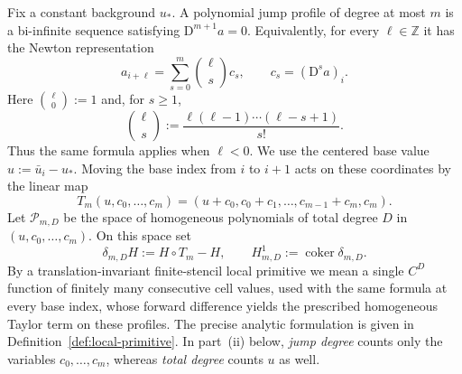 \documentclass[11pt]{amsart}
\theoremstyle{plain}
\theoremstyle{definition}
\theoremstyle{remark}
\numberwithin{equation}{section}
\theoremstyle{plain}
\begin{document}
Fix a constant background $u_*$.  A polynomial jump profile of degree at most $m$ is a
bi-infinite sequence satisfying $\mathrm D^{m+1}a=0$.  Equivalently, for every
$\ell\in\mathbb Z$ it has the Newton representation
\begin{equation}\label{eq:intro-polynomial-profile}
	 a_{i+\ell}=\sum_{s=0}^{m}\binom{\ell}{s}c_s,
	\qquad c_s=(\mathrm D^s a)_i.
\end{equation}
Here $\binom{\ell}{0}:=1$ and, for $s\ge1$,
\[
	\binom{\ell}{s}
	:=\frac{\ell(\ell-1)\cdots(\ell-s+1)}{s!}.
\]
Thus the same formula applies when $\ell<0$.  We use the centered base value
$u:=\bar u_i-u_*$.  
Moving the base index from $i$ to $i+1$ acts on these coordinates by the
linear map
\begin{equation}\label{eq:intro-profile-shift}
	T_m(u,c_0,\ldots,c_m)
	=(u+c_0,c_0+c_1,\ldots,c_{m-1}+c_m,c_m).
\end{equation}
Let $\mathscr P_{m,D}$ be the space of homogeneous polynomials of total degree
$D$ in $(u,c_0,\ldots,c_m)$.  On this space set
\begin{equation}\label{eq:intro-shift-cohomology}
	\delta_{m,D}H:=H\circ T_m-H,
	\qquad H^1_{m,D}:=\operatorname{coker}\delta_{m,D}.
\end{equation}
By a translation-invariant finite-stencil local primitive we mean a single
$C^D$ function of finitely many consecutive cell values, used with the same
formula at every base index, whose forward difference yields the prescribed
homogeneous Taylor term on these profiles.  The
precise analytic formulation is given in
Definition~\ref{def:local-primitive}.  In part~\textup{(ii)} below,
\emph{jump degree} counts only the variables $c_0,\ldots,c_m$, whereas
\emph{total degree} counts $u$ as well.
\end{document}
